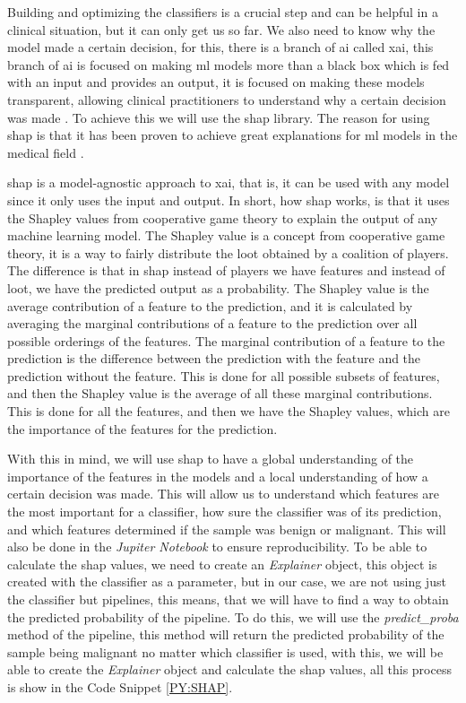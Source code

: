 Building and optimizing the classifiers is a crucial step and can be helpful in a clinical situation, but it can only get us so far. We also need to know why the model made a certain decision, for this, there is a branch of \ac{ai} called \acl{xai}, this branch of \ac{ai} is focused on making \ac{ml} models more than a black box which is fed with an input and provides an output, it is focused on making these models transparent, allowing clinical practitioners to understand why a certain decision was made \cite{borys_explainable_2023}. To achieve this we will use the \acl{shap} library. The reason for using \ac{shap} is that it has been proven to achieve great explanations for \ac{ml} models in the medical field \cite{massafra_analyzing_2023}.

\ac{shap} \cite{lundberg_unified_2017} is a model-agnostic approach to \ac{xai}, that is, it can be used with any model since it only uses the input and output. In short, how \ac{shap} works, is that it uses the Shapley values from cooperative game theory to explain the output of any machine learning model. The Shapley value is a concept from cooperative game theory, it is a way to fairly distribute the loot obtained by a coalition of players. The difference is that in \ac{shap} instead of players we have features and instead of loot, we have the predicted output as a probability. The Shapley value is the average contribution of a feature to the prediction, and it is calculated by averaging the marginal contributions of a feature to the prediction over all possible orderings of the features. The marginal contribution of a feature to the prediction is the difference between the prediction with the feature and the prediction without the feature. This is done for all possible subsets of features, and then the Shapley value is the average of all these marginal contributions. This is done for all the features, and then we have the Shapley values, which are the importance of the features for the prediction.

With this in mind, we will use \ac{shap} to have a global understanding of the importance of the features in the models and a local understanding of how a certain decision was made. This will allow us to understand which features are the most important for a classifier, how sure the classifier was of its prediction, and which features determined if the sample was benign or malignant. This will also be done in the \textit{Jupiter Notebook} to ensure reproducibility. To be able to calculate the \ac{shap} values, we need to create an \textit{Explainer} object, this object is created with the classifier as a parameter, but in our case, we are not using just the classifier but pipelines, this means, that we will have to find a way to obtain the predicted probability of the pipeline. To do this, we will use the \textit{predict\_proba} method of the pipeline, this method will return the predicted probability of the sample being malignant no matter which classifier is used, with this, we will be able to create the \textit{Explainer} object and calculate the \ac{shap} values, all this process is show in the Code Snippet \ref{PY:SHAP}.



